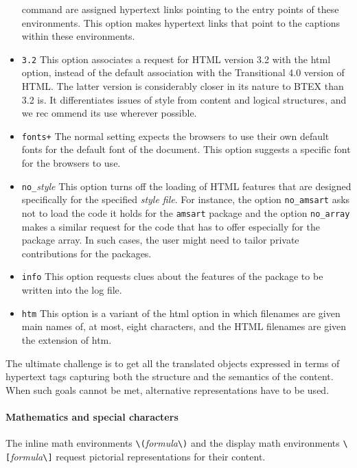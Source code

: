 \begin{itemize}
    command are assigned hypertext links pointing to the entry points of
    these environments. This option makes hypertext links that point to
    the captions within these environments. 
  \item \verb|3.2| This option associates a request for HTML version 3.2 with the html option, 
    instead of the default association with the Transitional 4.0 version of HTML. 
    The latter version is considerably closer in its nature to BTEX than 3.2 is. It 
    differentiates issues of style from content and logical structures, and we rec    ommend its use wherever possible. 
  \item \verb|fonts+| The normal setting expects the browsers to use their own default fonts for 
    the default font of the document. This option suggests a specific font for the 
    browsers to use. 
  \item \verb|no_|\emph{style} This option turns off the loading of HTML features that are designed 
    specifically for the specified \emph{style file}. For instance, the option
    \verb|no_amsart| asks \texht not to load the code it holds for the \verb|amsart|
    package and the option \verb|no_array| makes a similar request for the code
    that \texht has to offer especially for the package array. In such
    cases, the user might need to tailor private contributions for the
    packages. 
  \item \verb|info| This option requests clues about the features of the package to be written 
    into the log file. 
  \item \verb|htm| This option is a variant of the html option in which filenames are given main 
    names of, at most, eight characters, and the HTML filenames are given the 
    extension of htm. 
\end{itemize}
 

The ultimate challenge is to get all the translated objects expressed in
terms of hypertext tags capturing both the structure and the semantics
of the content. When such goals cannot be met, alternative
representations have to be used. 

\paragraph{Mathematics and special characters}

The inline math environments \verb|\(|\emph{formula}\verb|\)| and the
display math environments \verb|\[|\emph{formula}\verb|\]| request
pictorial representations for their content. 

